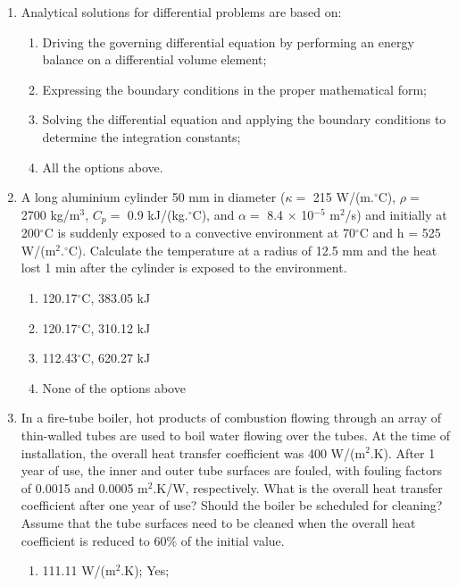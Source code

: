 \documentclass[12pts,a4paper,amsmath,amssymb,floatfix]{article}%
\begin{document}
\begin{enumerate}
%
\item Analytical solutions for differential problems are based on:
\begin{enumerate}
   \item Driving the governing differential equation by performing an energy balance on a differential volume element;
   \item Expressing the boundary conditions in the proper mathematical form;
   \item Solving the differential equation and applying the boundary conditions to determine the integration constants;
   \item All the options above. %
\end{enumerate}
%
\item A long aluminium cylinder 50 mm in diameter ($\kappa=$ 215 W/(m.$^{\circ}$C), $\rho=$ 2700 kg/m$^{3}$, $C_{p}=$ 0.9 kJ/(kg.$^{\circ}$C), and $\alpha=$ 8.4 × 10$^{-5}$ m$^{2}$/s) and initially at 200$^{\circ}$C is suddenly exposed to a convective environment at 70$^{\circ}$C and h = 525 W/(m$^{2}.^{\circ}$C). Calculate the temperature at a radius of 12.5 mm and the heat lost 1 min after the cylinder is exposed to the environment. %
\begin{enumerate}
   \item 120.17$^{\circ}$C, 383.05 kJ %
   \item 120.17$^{\circ}$C, 310.12 kJ
   \item 112.43$^{\circ}$C, 620.27 kJ
   \item None of the options above
\end{enumerate}
%
\item In a fire-tube boiler, hot products of combustion flowing through an array of thin-walled tubes are used to boil water flowing over the tubes. At the time of installation, the overall heat transfer coefficient was 400 W/(m$^{2}$.K). After 1 year of use, the inner and outer tube surfaces are fouled, with fouling factors of 0.0015 and 0.0005 m$^{2}$.K/W, respectively. What is the overall heat transfer coefficient after one year of use? Should the boiler be scheduled for cleaning? Assume that the tube surfaces need to be cleaned when the overall heat coefficient is reduced to 60$\%$ of the initial value. %
\begin{enumerate}
   \item 111.11 W/(m$^{2}$.K); Yes;

\end{enumerate}
\end{enumerate}
\end{document}
